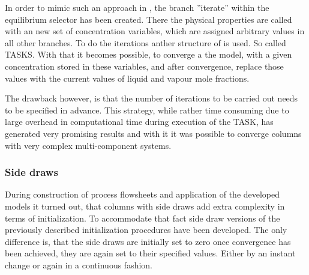         In order to mimic such an approach in \gproms, the branch ''iterate'' within the equilibrium
        selector has been created. There the physical properties are called with an new set of concentration
        variables, which are assigned arbitrary values in all other branches. To do the iterations anther
        structure of \gproms is used. So called TASKS. With that it becomes possible, to converge 
        a the model, with a given concentration stored in these variables, and after convergence, replace those 
        values with the current values of liquid and vapour mole fractions. 
        
        The drawback however, is that the number of iterations to be carried out needs to be specified in 
        advance. This strategy, while rather time consuming due to large overhead in computational time   
        during execution of the TASK, has generated very promising results and with it it was possible 
        to converge columns with very complex multi-component systems. 
        
    \subsubsection{Side draws} 
        During construction of process flowsheets and application of the developed models it turned 
        out, that columns with side draws add extra complexity in terms of initialization. To accommodate that 
        fact side draw versions of the previously described initialization procedures have been developed. 
        The only difference is, that the side draws are initially set to zero once convergence has been 
        achieved, they are again set to their specified values. Either by an instant change or again 
        in a continuous fashion. 